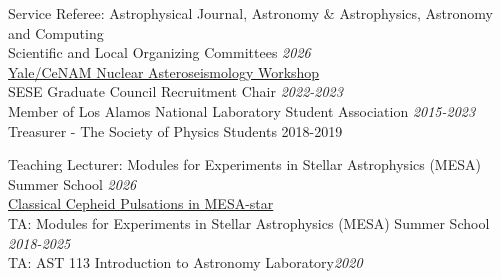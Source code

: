 \documentclass{resume} %
\begin{document}












\begin{rSection}{Service}
Referee: Astrophysical Journal, Astronomy \& Astrophysics, Astronomy and Computing
\\Scientific and Local Organizing Committees \hfill {\em 2026}
\\ \href{https://www.astro.yale.edu/bellinger/meetings/2026/cenam/}{Yale/CeNAM Nuclear Asteroseismology Workshop}
\\ SESE Graduate Council Recruitment Chair \hfill {\em 2022-2023} 
\\ Member of Los Alamos National Laboratory Student Association \hfill{\em 2015-2023}
\\ Treasurer - The Society of Physics Students \hfill {2018-2019}
\end{rSection}
\begin{rSection}{Teaching}
Lecturer: Modules for Experiments in Stellar Astrophysics (MESA) Summer School \hfill {\em 2026}
\\ \href{https://mesastar.org/summer-school-2026/}{Classical Cepheid Pulsations in MESA-star}
\\TA: Modules for Experiments in Stellar Astrophysics (MESA) Summer School \hfill {\em 2018-2025}
\\ TA: AST 113 Introduction to Astronomy Laboratory\hfill {\em 2020}
\end{rSection}
\end{document}
